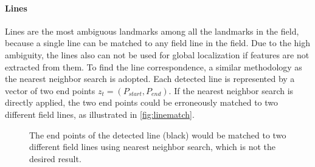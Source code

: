 \paragraph{Lines}
Lines are the most ambiguous landmarks among all the landmarks in the field, because a single line can be matched to any field line in the field. Due to the high ambiguity, the lines also can not be used for global localization if features are not extracted from them. To find the line correspondence, a similar methodology as the nearest neighbor search is adopted. Each detected line is represented by a vector of two end points $z_t=(P_{start}, P_{end})$. If the nearest neighbor search is directly applied, the two end points could be erroneously matched to two different field lines, as illustrated in \autoref{fig:linematch}.

\begin{figure}[h!]
\centering
{}
  \caption[Matching of end points of the detected line.]{The end points of the detected line (black) would be matched to two different field lines using nearest neighbor search, which is not the desired result.}
\label{fig:linematch}
\end{figure}

